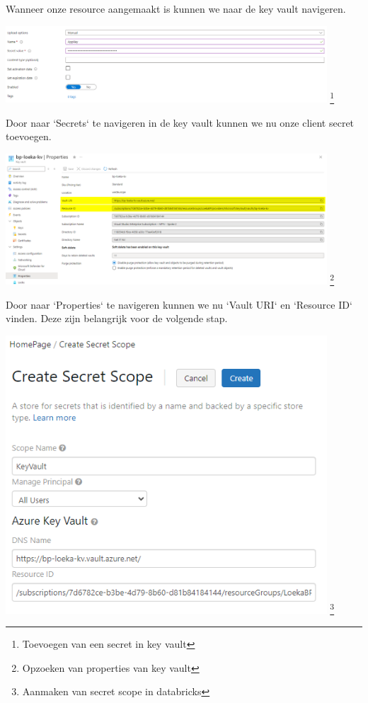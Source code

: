 Wanneer onze resource aangemaakt is kunnen we naar de key vault navigeren.

\begin{center}
    \includegraphics[width=0.9\textwidth]{./graphics/databricks/connection_12.png}
    \footnote{Toevoegen van een secret in key vault}
\end{center}

Door naar `Secrets` te navigeren in de key vault kunnen we nu onze client secret toevoegen.

\begin{center}
    \includegraphics[width=0.9\textwidth]{./graphics/databricks/connection_13.png}
    \footnote{Opzoeken van properties van key vault}
\end{center}

Door naar `Properties` te navigeren kunnen we nu `Vault URI` en `Resource ID` vinden. Deze zijn belangrijk voor de volgende stap.

\begin{center}
    \includegraphics[width=0.9\textwidth]{./graphics/databricks/connection_14.png}
    \footnote{Aanmaken van secret scope in databricks}
\end{center}

